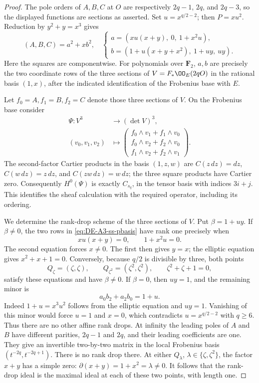\begin{proof}
The pole orders of $A,B,C$ at $O$ are respectively $2q-1$, $2q$, and
$2q-3$, so the displayed functions are sections as asserted.  Set
$u=x^{q/2-2}$; then $P=xu^2$.  Reduction by $y^2+y=x^3$ gives
\begin{equation}
 (A,B,C)=a^2+xb^2,
 \quad
 \begin{cases}
 a=(xu(x+y),\ 0,\ 1+x^2u),\\
 b=(1+u(x+y+x^2),\ 1+uy,\ uy).
 \end{cases}                                                   \label{eq:DE-A3-ss-pbasis}
\end{equation}
Here the squares are componentwise.  For polynomials over $\mathbf F_2$,
$a,b$ are precisely the two coordinate rows of the three sections of
$V=F_*\OO_E(2qO)$ in the rational basis $(1,x)$, after the indicated
identification of the Frobenius base with $E$.

Let $f_0=A,f_1=B,f_2=C$ denote those three sections of $V$.  On the
Frobenius base consider
\[
\begin{aligned}
 \Psi:V^3&\longrightarrow(\det V)^3,\\
 (v_0,v_1,v_2)&\longmapsto
 \begin{pmatrix}
 f_0\wedge v_1+f_1\wedge v_0\\
 f_0\wedge v_2+f_2\wedge v_0\\
 f_1\wedge v_2+f_2\wedge v_1
 \end{pmatrix}.
\end{aligned}
\]
The second-factor Cartier products in the basis $(1,z,w)$ are
$C(z\,dz)=dz$, $C(w\,dz)=z\,dz$, and $C(zw\,dz)=w\,dz$;
the three square products have Cartier zero.  Consequently $H^0(\Psi)$
is exactly $C_{s_q}$, in the tensor basis with indices $3i+j$.
This identifies the sheaf calculation with the required operator,
including its ordering.

We determine the rank-drop scheme of the three sections of $V$.
Put $\beta=1+uy$.  If $\beta\ne0$, the two rows in
\eqref{eq:DE-A3-ss-pbasis} have rank one precisely when
\[
                 xu(x+y)=0,\qquad 1+x^2u=0.
\]
The second equation forces $x\ne0$.  The first then gives $y=x$;
the elliptic equation gives $x^2+x+1=0$.  Conversely, because
$q/2$ is divisible by three, both points
\[
          Q_\zeta=(\zeta,\zeta),\qquad
          Q_{\zeta^2}=(\zeta^2,\zeta^2),\qquad \zeta^2+\zeta+1=0,
\]
satisfy these equations and have $\beta\ne0$.
If $\beta=0$, then $uy=1$, and the remaining minor is
\[
 a_0b_2+a_2b_0=1+u.
\]
Indeed $1+u=x^3u^2$ follows from the elliptic equation and $uy=1$.
Vanishing of this minor would force $u=1$ and $x=0$, which contradicts
$u=x^{q/2-2}$ with $q\ge6$.  Thus there are no other affine rank drops.
At infinity the leading poles of $A$ and $B$ have different parities,
$2q-1$ and $2q$, and their leading coefficients are one.  They give
an invertible two-by-two matrix in the local Frobenius basis
$(t^{-2q},t^{-2q+1})$.  There is no rank drop there.
At either $Q_\lambda$, $\lambda\in\{\zeta,\zeta^2\}$, the factor
$x+y$ has a simple zero: $\partial(x+y)=1+x^2=\lambda\ne0$.
It follows that the rank-drop ideal is the maximal ideal at each of
these two points, with length one.


\end{proof}
